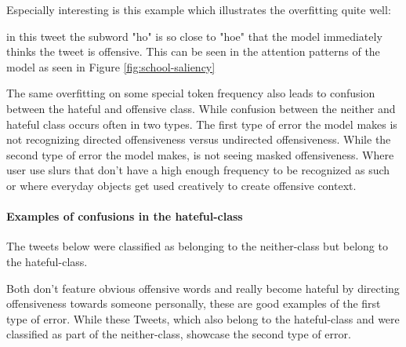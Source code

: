 \documentclass[11pt,a4paper]{article}
\begin{document}
Especially interesting is this example which illustrates the overfitting quite well:

\begin{center}
\end{center}

in this tweet the subword "ho" is so close to "hoe" that the model immediately thinks the tweet is offensive.
This can be seen in the attention patterns of the model as seen in Figure \ref{fig:school-saliency}

The same overfitting on some special token frequency also leads to confusion between the hateful and offensive class.
While confusion between the neither and hateful class occurs often in two types.
The first type of error the model makes is not recognizing directed offensiveness versus undirected offensiveness.
While the second type of error the model makes, is not seeing masked offensiveness.
Where user use slurs that don't have a high enough frequency to be recognized as such 
or where everyday objects get used creatively to create offensive context.

\paragraph{Examples of confusions in the hateful-class}
The tweets below were classified as belonging to the neither-class but belong to the hateful-class.

\begin{center}
  \newline
  \newline
\end{center}

Both don't feature obvious offensive words and really become hateful by directing offensiveness towards someone personally, 
these are good examples of the first type of error.
While these Tweets, which also belong to the hateful-class and were classified as part of the neither-class, showcase the second type of error.
\begin{center}
  \newline
   \newline
   \newline
\end{center}
\end{document}
